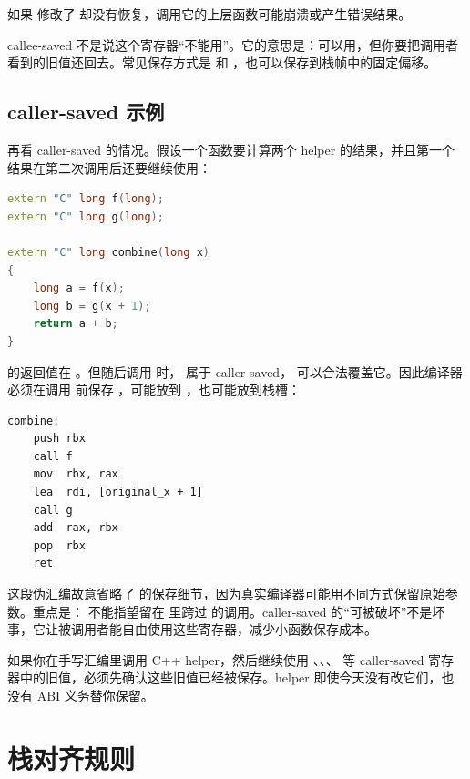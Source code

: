 如果  修改了  却没有恢复，调用它的上层函数可能崩溃或产生错误结果。

\begin{deepdive}
callee-saved 不是说这个寄存器“不能用”。它的意思是：可以用，但你要把调用者看到的旧值还回去。常见保存方式是  和 ，也可以保存到栈帧中的固定偏移。
\end{deepdive}

\subsection{caller-saved 示例}

再看 caller-saved 的情况。假设一个函数要计算两个 helper 的结果，并且第一个结果在第二次调用后还要继续使用：

\begin{lstlisting}[language=C++]
extern "C" long f(long);
extern "C" long g(long);

extern "C" long combine(long x)
{
    long a = f(x);
    long b = g(x + 1);
    return a + b;
}
\end{lstlisting}

 的返回值在 。但随后调用  时， 属于 caller-saved， 可以合法覆盖它。因此编译器必须在调用  前保存 ，可能放到 ，也可能放到栈槽：

\begin{lstlisting}
combine:
    push rbx
    call f
    mov  rbx, rax
    lea  rdi, [original_x + 1]
    call g
    add  rax, rbx
    pop  rbx
    ret
\end{lstlisting}

这段伪汇编故意省略了  的保存细节，因为真实编译器可能用不同方式保留原始参数。重点是： 不能指望留在  里跨过  的调用。caller-saved 的“可被破坏”不是坏事，它让被调用者能自由使用这些寄存器，减少小函数保存成本。

\begin{warningbox}
如果你在手写汇编里调用 C++ helper，然后继续使用 、、、 等 caller-saved 寄存器中的旧值，必须先确认这些旧值已经被保存。helper 即使今天没有改它们，也没有 ABI 义务替你保留。
\end{warningbox}

\section{栈对齐规则}


